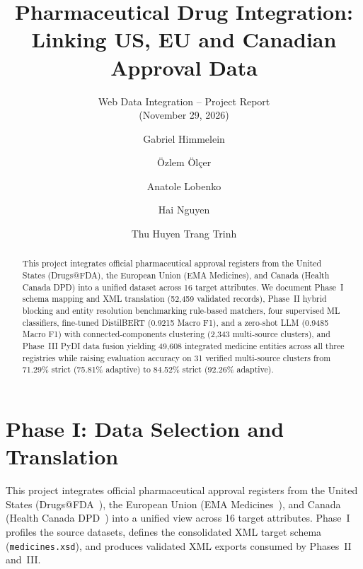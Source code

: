 \documentclass{llncs}
\begin{document}
\pagestyle{plain}

\title{Pharmaceutical Drug Integration: Linking US, EU and Canadian Approval Data}
\subtitle{Web Data Integration -- Project Report\\(November 29, 2026)}

\author{
  Gabriel Himmelein \and
  \"Ozlem \"Ol\c{c}er \and
  Anatole Lobenko \and
  Hai Nguyen \and
  Thu Huyen Trang Trinh
}


\maketitle

\begin{abstract}
This project integrates official pharmaceutical approval registers from the United States (Drugs@FDA), the European Union (EMA Medicines), and Canada (Health Canada DPD) into a unified dataset across 16 target attributes. We document Phase~I schema mapping and XML translation (52,459 validated records), Phase~II hybrid blocking and entity resolution benchmarking rule-based matchers, four supervised ML classifiers, fine-tuned DistilBERT (0.9215 Macro F1), and a zero-shot LLM (0.9485 Macro F1) with connected-components clustering (2,343 multi-source clusters), and Phase~III PyDI data fusion yielding 49,608 integrated medicine entities across all three registries while raising evaluation accuracy on 31 verified multi-source clusters from 71.29\% strict (75.81\% adaptive) to 84.52\% strict (92.26\% adaptive).
\end{abstract}

\section{Phase I: Data Selection and Translation}

This project integrates official pharmaceutical approval registers from the United States (Drugs@FDA~\cite{fda_drugsatfda}), the European Union (EMA Medicines~\cite{ema_medicines}), and Canada (Health Canada DPD~\cite{healthcanada_dpd}) into a unified view across 16 target attributes. Phase~I profiles the source datasets, defines the consolidated XML target schema (\texttt{medicines.xsd}), and produces validated XML exports consumed by Phases~II and~III.
\end{document}
